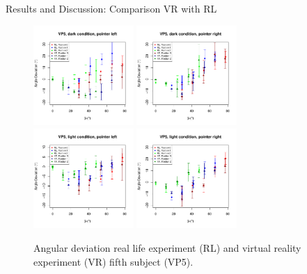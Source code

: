 \documentclass{beamer}
\begin{document}

\begin{frame}{Results and Discussion: Comparison VR with RL}
    \begin{minipage}{10cm}
        \begin{figure}
            \centering
            \includegraphics[clip, trim = 0cm 0.5cm 0.5cm 0.6cm, width = 3.8cm]{Images/plots/AngleDevVP5BOTHDarkLeft.pdf}
            \includegraphics[clip, trim = 0cm 0.5cm 0.5cm 0.6cm, width = 3.8cm]{Images/plots/AngleDevVP5BOTHDarkRight.pdf}
            \includegraphics[clip, trim = 0cm 0.5cm 0.5cm 0.6cm, width = 3.8cm]{Images/plots/AngleDevVP5BOTHLightLeft.pdf}
            \includegraphics[clip, trim = 0cm 0.5cm 0.5cm 0.6cm, width = 3.8cm]{Images/plots/AngleDevVP5BOTHLightRight.pdf}
            \caption{Angular deviation real life experiment (RL) and virtual reality experiment (VR) fifth subject (VP5).}
            \label{DevVP3}
        \end{figure}
    \end{minipage}
\end{frame}
\end{document}
